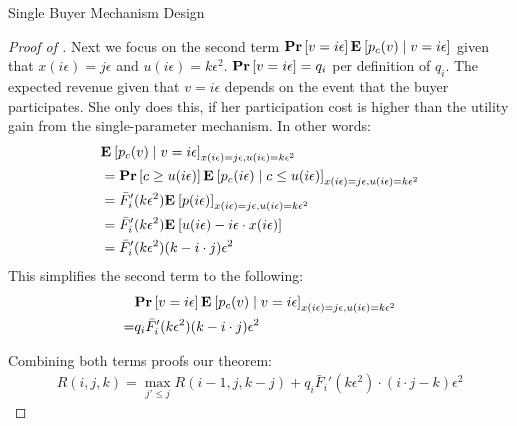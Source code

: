 \documentclass[11pt,a4paper]{article}
\renewcommand{\Pr}[1]{\mbox{\rm\bf Pr}\left[#1\right]}
\newcommand{\Ex}[2][]{\mbox{\rm\bf E}_{#1}\left[#2\right]}
\newcommand{\1}[1]{\mbox{\rm\bf 1}_{#1}}
\begin{document}
\begin{section}{Single Buyer Mechanism Design}
\begin{proof}[Proof of ]
     Next we focus on the second term $\Pr{v = i \epsilon} \Ex{p_c(v) \mid v = i \epsilon}$ given that $x(i\epsilon) = j\epsilon$ and $u(i\epsilon) = k\epsilon^2$.
     $\Pr{v = i \epsilon} = q_i$ per definition of $q_i$.
     The expected revenue given that $v = i \epsilon$ depends on the event that the buyer participates.
     She only does this, if her participation cost is higher than the utility gain from the single-parameter mechanism.
     In other words:
     \begin{align*}
          & \Ex{p_c(v) \mid v = i \epsilon}_{x(i\epsilon) = j \epsilon, u(i\epsilon) = k\epsilon^2}                                         \\
          & = \Pr{c \geq u(i\epsilon)} \Ex{p_c(i\epsilon) \mid c \leq u(i\epsilon)}_{x(i\epsilon) = j \epsilon, u(i\epsilon) = k\epsilon^2} \\
          & = \bar{F}_i'(k\epsilon^2) \Ex{p(i\epsilon)}_{x(i\epsilon) = j \epsilon, u(i\epsilon) = k\epsilon^2}                             \\
          & = \bar{F}_i'(k\epsilon^2) \Ex{u(i\epsilon) - i\epsilon \cdot x(i\epsilon)}                                                      \\
          & = \bar{F}_i'(k\epsilon^2) (k - i \cdot j)\epsilon^2
     \end{align*}
     This simplifies the second term to the following:
     \begin{align*}
           & \Pr{v = i \epsilon} \Ex{p_c(v) \mid v = i \epsilon}_{x(i\epsilon) = j \epsilon, u(i\epsilon) = k\epsilon^2} \\
         = & q_i \bar{F}_i'(k\epsilon^2) (k - i \cdot j)\epsilon^2
     \end{align*}

     Combining both terms proofs our theorem:
     \begin{align*}
         R(i,j,k) = \max_{j' \leq j} R(i-1, j, k - j) + q_i \bar{F}_i'(k \epsilon^2) \cdot (i\cdot j - k)\epsilon^2
     \end{align*}
 \end{proof}


\end{section}
\end{document}
